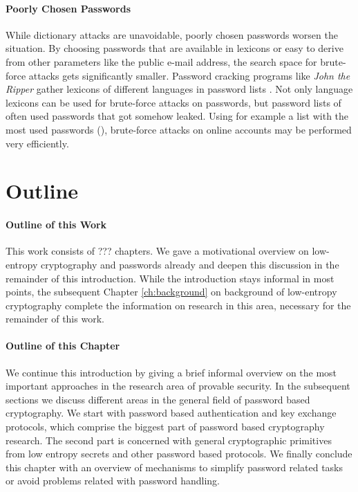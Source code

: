 \paragraph{Poorly Chosen Passwords}
While dictionary attacks are unavoidable, poorly chosen passwords worsen the situation.
By choosing passwords that are available in lexicons or easy to derive from other parameters like the public e-mail address, the search space for brute-force attacks gets significantly smaller.
Password cracking programs like \emph{John the Ripper} \cite{JohnTheRipper} gather lexicons of different languages in password lists \cite{JohnTheRipperWordlist}.
Not only language lexicons can be used for brute-force attacks on passwords, but password lists of often used passwords that got somehow leaked.
Using for example a list with the most used passwords (\eg \cite{XatoPwds}), brute-force attacks on online accounts may be performed very efficiently.

\section{Outline}

\paragraph{Outline of this Work}
This work consists of ??? chapters.
We gave a motivational overview on low-entropy cryptography and passwords already and deepen this discussion in the remainder of this introduction.
While the introduction stays informal in most points, the subsequent Chapter \ref{ch:background} on background of low-entropy cryptography complete the information on research in this area, necessary for the remainder of this work.

\paragraph{Outline of this Chapter}
We continue this introduction by giving a brief informal overview on the most important approaches in the research area of provable security.
In the subsequent sections we discuss different areas in the general field of password based cryptography.
We start with password based authentication and key exchange protocols, which comprise the biggest part of password based cryptography research.
The second part is concerned with general cryptographic primitives from low entropy secrets and other password based protocols.
We finally conclude this chapter with an overview of mechanisms to simplify password related tasks or avoid problems related with password handling.

